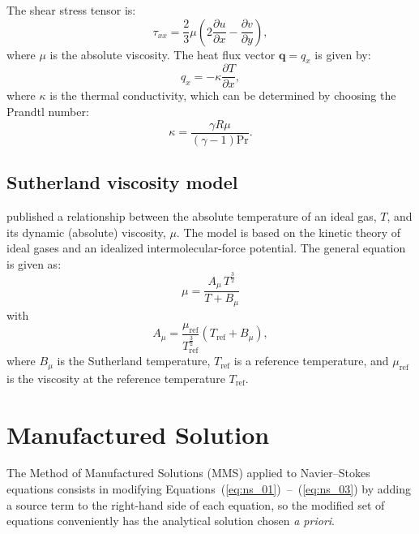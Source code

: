 \documentclass[10pt]{article}
\newcommand{\diff}[2] {\dfrac{\partial #1}{\partial #2}}
\begin{document}
The shear stress tensor is:
\begin{equation}
  \tau_{xx}= \dfrac{2}{3}  \mu \left( 2 \diff{u}{x} - \diff{v}{y} \right),
\end{equation}
where $\mu$ is the absolute viscosity. The heat flux vector $\mathbf{q}=q_x$ is given by:
\begin{equation}
 q_x = - \kappa \diff{T}{x},
 \end{equation}
where $\kappa$ is the thermal conductivity, which can be determined by choosing the Prandtl number:
\begin{equation}
 \label{eq:k}
\kappa = \dfrac{\gamma R \mu}{ (\gamma-1) \text{Pr}}.
\end{equation}



\subsection{Sutherland viscosity model}

\citet{Sutherland1893} published a relationship between the absolute temperature of an ideal gas, $T$,  and its dynamic (absolute) viscosity, $\mu$. The model is based on the kinetic theory of ideal gases and an idealized intermolecular-force potential. The general equation is given as:
\begin{equation}
\label{eq:Sutherland01}
 \mu  =\dfrac{A_\mu \, T^{\frac{3}{2}}}{T+B_\mu}
\end{equation}
with
\begin{equation}
\label{eq:Sutherland02}
A_\mu = \dfrac{\mu_\text{ref}}{T_{\text{ref}}^{\frac{3}{2}}}(T_\text{ref} + B_\mu),
\end{equation}
%
where $B_\mu$ is the Sutherland temperature, $T_{\text{ref}}$ is a reference temperature,  and $\mu_\text{ref}$ is the viscosity at the reference temperature $T_\text{ref}$.


\section{Manufactured Solution}

The Method of Manufactured Solutions (MMS) applied to Navier--Stokes equations consists in modifying Equations~(\ref{eq:ns_01})~--~(\ref{eq:ns_03}) by adding a source term to the right-hand side of each equation, so the modified set of equations conveniently has the analytical solution chosen \textit{a priori}.
\end{document}
